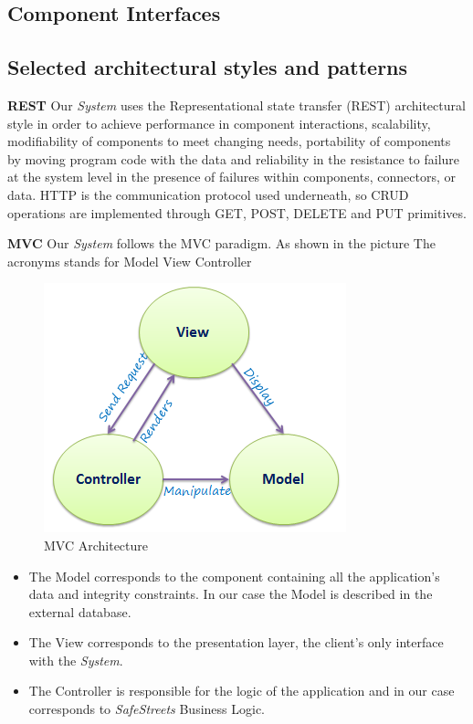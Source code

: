 \documentclass{article}
\begin{document}
\subsection{Component Interfaces}
\subsection{Selected architectural styles and patterns}

\textbf{REST}
Our \textit{System} uses the Representational state transfer (REST) architectural style in order to achieve 
performance in component interactions, scalability, modifiability of components to meet changing needs, portability 
of components by moving program code with the data and reliability in the resistance to failure at the system level
in the presence of failures within components, connectors, or data. HTTP is the communication protocol used underneath, 
so CRUD operations are implemented through GET, POST, DELETE and PUT primitives.


\textbf{MVC}
Our \textit{System} follows the MVC paradigm. As shown in the picture The acronyms stands for Model View Controller

\begin{figure}[H]
    \centering
    \includegraphics[scale=0.5]{img/mvc-architecture.png}
    \caption{MVC Architecture}
\end{figure}

\begin{itemize}
    \item The Model corresponds to the component containing all the application's data and integrity constraints. 
    In our case the Model is described in the external database.
    \item The View corresponds to the presentation layer, the client's only interface with the \textit{System}.
    \item The Controller is responsible for the logic of the application and in our case corresponds to \textit{SafeStreets}
    Business Logic.
\end{itemize}
\clearpage
\end{document}
